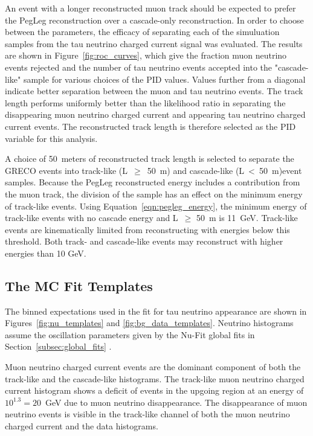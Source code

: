 An event with a longer reconstructed muon track should be expected to prefer the PegLeg reconstruction over a cascade-only reconstruction.
In order to choose between the parameters, the efficacy of separating each of the simuluation samples from the tau neutrino charged current signal was evaluated.
The results are shown in Figure~\ref{fig:roc_curves}, which give the fraction muon neutrino events rejected and the number of tau neutrino events accepted into the "cascade-like" sample for various choices of the PID values. 
Values further from a diagonal indicate better separation between the muon and tau neutrino events.
The track length performs uniformly better than the likelihood ratio in separating the disappearing muon neutrino charged current and appearing tau neutrino charged current events.
The reconstructed track length is therefore selected as the PID variable for this analysis.

A choice of 50~meters of reconstructed track length is selected to separate the GRECO events into track-like (L~$\geq$~50~m) and cascade-like (L~<~50~m)event samples. 
Because the PegLeg reconstructed energy includes a contribution from the muon track, the division of the sample has an effect on the minimum energy of track-like events.
Using Equation~\ref{eqn:pegleg_energy}, the minimum energy of track-like events with no cascade energy and L~$\geq$ 50~m is 11~GeV.
Track-like events are kinematically limited from reconstructing with energies below this threshold.
Both track- and cascade-like events may reconstruct with higher energies than 10 GeV.


\label{subsec:fit_templates}
\subsection{The MC Fit Templates}
The binned expectations used in the fit for tau neutrino appearance are shown in Figures~\ref{fig:nu_templates} and \ref{fig:bg_data_templates}.
Neutrino histograms assume the oscillation parameters given by the Nu-Fit global fits in Section~\ref{subsec:global_fits} \cite{NuFit.org}.

Muon neutrino charged current events are the dominant component of both the track-like and the cascade-like histograms.
The track-like muon neutrino charged current histogram shows a deficit of events in the upgoing region at an energy of $10^{1.3}=20$~GeV due to muon neutrino disappearance.
The disappearance of muon neutrino events is visible in the track-like channel of both the muon neutrino charged current and the data histograms.


